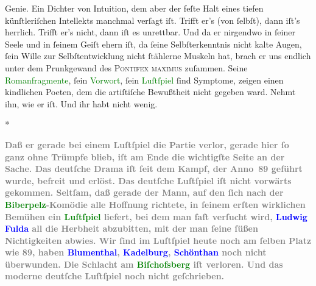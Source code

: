 {{                  Genie. Ein Dichter von Intuition, dem aber der feſte Halt eines tiefen
                  künſtleriſchen Intellekts manchmal verſagt iſt. Trifft er’s (von ſelbſt), dann
                  iſt’s herrlich. Trifft er’s nicht, dann iſt es unrettbar. Und da er nirgendwo in
                  ſeiner Seele und in ſeinem Geiſt ehern iſt, da ſeine Selbſterkenntnis nicht kalte
                  Augen, ſein Wille zur Selbſtentwicklung nicht ſtählerne Muskeln hat, brach er uns
                  endlich unter dem Prunkgewand des \textsc{Pontifex maximus}
                  zuſammen. Seine \textcolor{green}{Romanfragmente}{}\ledrightnote{{$\rightarrow$}\textcolor{green}{?? [Romanfragmente von Gerhart Hauptmann]}}, ſein \textcolor{green}{Vorwort}{}\ledrightnote{{$\rightarrow$}\textcolor{green}{Gesammelte Werke in sechs Bänden}}, ſein \textcolor{green}{Luſtſpiel}{}\ledrightnote{{$\rightarrow$}\textcolor{green}{Die Jungfern vom Bischofsberg. Lustspiel}} ſind Symptome, zeigen einen kindlichen Poeten, dem die
                  artiſtiſche Bewußtheit nicht gegeben ward. Nehmt ihn, wie er iſt. Und ihr habt
                  nicht wenig.}}\pend
           
\pstart
           \centering{}\textcolor{gray}{\textbf{*}}\pend
           
\pstart
           \noindent{}\textcolor{gray}{\textbf{Daß er gerade bei einem Luſtſpiel die Partie verlor, gerade hier
                  ſo ganz ohne Trümpfe blieb, iſt am Ende die wichtigſte Seite an der Sache. Das
                  deutſche Drama iſt ſeit dem Kampf, der Anno 89 geführt
                  wurde, befreit und erlöst. Das deutſche Luſtſpiel iſt nicht vorwärts gekommen.
                  Seltſam, daß gerade der Mann, auf den ſich nach der \textcolor{green}{Biberpelz}{}\ledrightnote{\textcolor{green}{Der Biberpelz. Eine Diebskomödie}}-Komödie alle Hoffnung richtete, in ſeinem erſten
                  wirklichen Bemühen ein \textcolor{green}{Luſtſpiel}{}\ledrightnote{{$\rightarrow$}\textcolor{green}{Die Jungfern vom Bischofsberg. Lustspiel}} liefert, bei dem man faſt verſucht wird, \textcolor{blue}{Ludwig Fulda}{}\ledrightnote{\textcolor{blue}{Ludwig Fulda}} all die Herbheit abzubitten, mit der man ſeine
                  ſüßen Nichtigkeiten abwies. Wir ſind im Luſtſpiel heute noch am ſelben Platz wie
                  89, haben \textcolor{blue}{Blumenthal}{}\ledrightnote{\textcolor{blue}{Oskar Blumenthal}}, \textcolor{blue}{Kadelburg}{}\ledrightnote{\textcolor{blue}{Gustav Kadelburg}}, \textcolor{blue}{Schönthan}{}\ledrightnote{\textcolor{blue}{Franz von Schönthan-Pernwald}}
                  noch nicht überwunden. Die Schlacht am \textcolor{green}{Biſchofsberg}{}\ledrightnote{\textcolor{green}{Die Jungfern vom Bischofsberg. Lustspiel}} iſt verloren. Und das moderne deutſche Luſtſpiel noch nicht
                  geſchrieben.}}\pend
           
